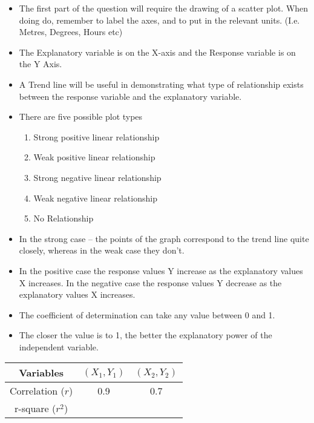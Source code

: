 \documentclass[]{report}
\begin{document}
\begin{itemize}
	\item 
	The first part of the question will require the drawing of a scatter plot. 
	When doing do, remember to label the axes, and to put in the relevant units. (I.e. Metres, Degrees, Hours etc)
	\item 
	The Explanatory variable is on the X-axis and the Response variable is on the Y Axis.
	\item 
	A Trend line will be useful in demonstrating what type of relationship exists between the response variable and the explanatory variable.
	\item There are five possible plot types
	
	
	
	\begin{enumerate}
		
		\item Strong positive linear relationship 
		\item Weak positive linear relationship
		\item Strong negative linear relationship
		\item Weak negative linear relationship
		\item No Relationship
	\end{enumerate}
	\item  In the strong case – the points of the graph correspond to the trend line quite closely, whereas in the weak case they don’t.
	\item In the positive case the response values Y increase as the explanatory values X increases. In the negative case the response values Y decrease as the explanatory values X increases. 
\end{itemize}




\begin{itemize}
	\item The coefficient of determination can take any value between 0 and 1.
	\item The closer the value is to 1, the better the explanatory power of the independent variable.
\end{itemize}

\begin{tabular}{|c|c|c|}
	\hline Variables & $(X_1,Y_1)$ & $(X_2,Y_2)$ \\ 
	\hline Correlation ($r$) & 0.9 & 0.7 \\ 
	\hline r-square ($r^2$) &  &  \\ 
	\hline 
\end{tabular} 
\end{document}

